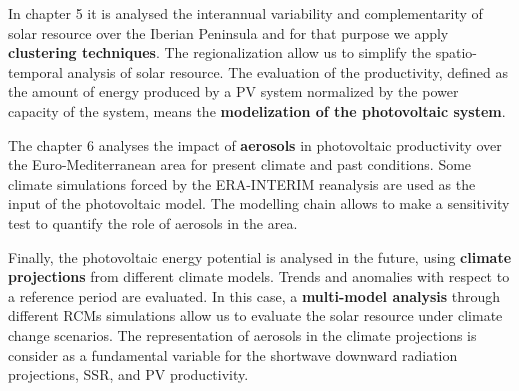   In chapter 5 it is analysed the interannual variability and complementarity of solar resource over the Iberian Peninsula and for that purpose we apply \textbf{clustering techniques}. The regionalization allow us to simplify the spatio-temporal analysis of solar resource. The evaluation of the productivity, defined as the amount of energy produced by a PV system normalized by the power capacity of the system, means the \textbf{modelization of the photovoltaic system}.
  
  The chapter 6 analyses the impact of \textbf{aerosols} in photovoltaic productivity over the Euro-Mediterranean area for present climate and past conditions.  Some climate simulations forced by the ERA-INTERIM reanalysis are used as the input of the photovoltaic model. The modelling chain allows to make a sensitivity test to quantify the role of aerosols in the area.

  
  Finally, the photovoltaic energy potential is analysed in the future, using \textbf{climate projections} from different climate models. Trends and anomalies with respect to a reference period are evaluated. In this case, a \textbf{multi-model analysis} through different RCMs simulations allow us to evaluate the solar resource under climate change scenarios. The representation of aerosols in the climate projections is consider as a fundamental variable for the shortwave downward radiation projections, SSR, and PV productivity.

  
